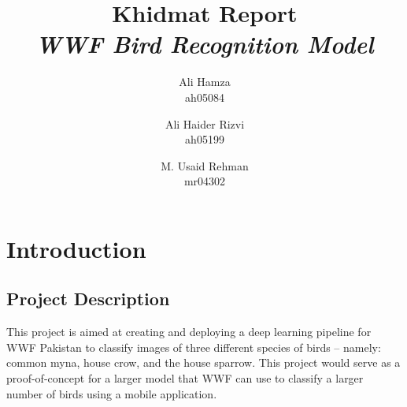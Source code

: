 \documentclass[11pt]{article}
\title{\Huge Khidmat Report\\
\textit{WWF Bird Recognition Model}}
\author{Ali Hamza\\ ah05084
  \and
  Ali Haider Rizvi\\ ah05199
  \and
  M. Usaid Rehman\\ mr04302
}
\date{}
\begin{document}
\maketitle
\begin{center}
    
\begin{figure}[h!]
    \centering
    \qquad
    \label{fig:example}%
\end{figure}
\end{center}

\newpage
\tableofcontents
\newpage
\section{Introduction}
\subsection{Project Description}
\setlength{\parindent}{3em}
This project is aimed at creating and deploying a deep learning pipeline for WWF Pakistan to classify images of 
three different species of birds -- namely: common myna, house crow, and the house sparrow. This project 
would serve as a proof-of-concept for a larger model that WWF can use to classify a larger number of birds 
using a mobile application.
\end{document}
